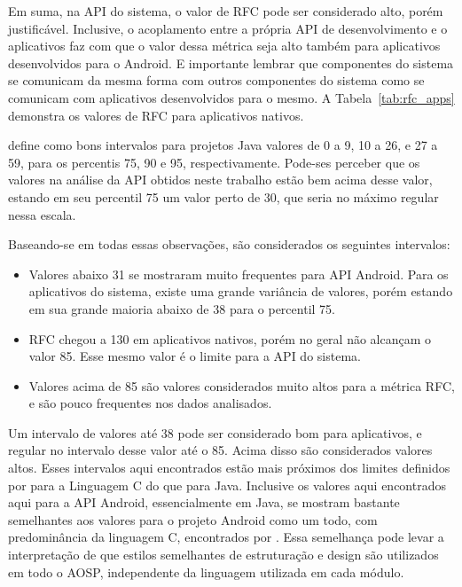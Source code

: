 Em suma, na API do sistema, o valor de RFC pode ser considerado alto, porém justificável. Inclusive, o acoplamento entre a própria API de desenvolvimento e o aplicativos faz com que o valor dessa métrica seja alto também para aplicativos desenvolvidos para o Android. E importante lembrar que componentes do sistema se comunicam da mesma forma com outros componentes do sistema como se comunicam com aplicativos desenvolvidos para o mesmo. A Tabela~\ref{tab:rfc_apps} demonstra os valores de RFC para aplicativos nativos.

 define como bons intervalos para projetos Java valores de 0 a 9, 10 a 26, e 27 a 59, para os percentis 75, 90 e 95, respectivamente. Pode-ses perceber que os valores na análise da API obtidos neste trabalho estão bem acima desse valor, estando em seu percentil 75 um valor perto de 30, que seria no máximo regular nessa escala.

Baseando-se em todas essas observações, são considerados os seguintes intervalos:

\begin{itemize}
\item Valores abaixo 31 se mostraram muito frequentes para API Android. Para os aplicativos do sistema, existe uma grande variância de valores, porém estando em sua grande maioria abaixo de 38 para o percentil 75.
\item RFC chegou a 130 em aplicativos nativos, porém no geral não alcançam o valor 85. Esse mesmo valor é o limite para a API do sistema.
\item Valores acima de 85 são valores considerados muito altos para a métrica RFC, e são pouco frequentes nos dados analisados.
\end{itemize}

Um intervalo de valores até 38 pode ser considerado bom para aplicativos, e regular no intervalo desse valor até o 85. Acima disso são considerados valores altos. Esses intervalos aqui encontrados estão mais próximos dos limites definidos por  para a Linguagem C do que para Java. Inclusive os valores aqui encontrados aqui para a API Android, essencialmente em Java, se mostram bastante semelhantes aos valores para o projeto Android como um todo, com predominância da linguagem C, encontrados por . Essa semelhança pode levar a interpretação de que estilos semelhantes de estruturação e design são utilizados em todo o AOSP, independente da linguagem utilizada em cada módulo.
